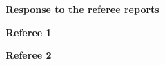 \documentclass[a4paper,11pt]{article}
\begin{document}
\begin{center}
  \textbf{Response to the referee reports}
\end{center}


\begin{center}
  \textbf{Referee 1}
\end{center}



\reply{\dots}

\changes{\dots}

\bigskip



\reply{\dots}

\changes{\dots}

\newpage


\begin{center}
  \textbf{Referee 2}
\end{center}



\reply{\dots}

\changes{\dots}

\bigskip



\reply{\dots}

\changes{\dots}
\end{document}
